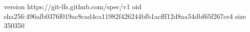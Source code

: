 version https://git-lfs.github.com/spec/v1
oid sha256:496afb0376f019ac8cad4ca11982f426244bfb1acfff12d8aa54dbf65f267ce4
size 350350
